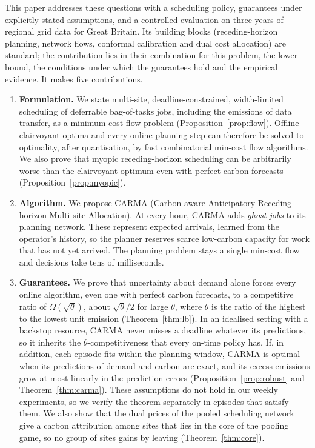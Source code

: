 This paper addresses these questions with a scheduling policy, guarantees under explicitly stated assumptions, and a controlled evaluation on three years of regional grid data for Great Britain. Its building blocks (receding-horizon planning, network flows, conformal calibration and dual cost allocation) are standard; the contribution lies in their combination for this problem, the lower bound, the conditions under which the guarantees hold and the empirical evidence. It makes five contributions.
\begin{enumerate}
\item \textbf{Formulation.} We state multi-site, deadline-constrained, width-limited scheduling of deferrable bag-of-tasks jobs, including the emissions of data transfer, as a minimum-cost flow problem (Proposition~\ref{prop:flow}). Offline clairvoyant optima and every online planning step can therefore be solved to optimality, after quantisation, by fast combinatorial min-cost flow algorithms. We also prove that myopic receding-horizon scheduling can be arbitrarily worse than the clairvoyant optimum even with perfect carbon forecasts (Proposition~\ref{prop:myopic}).
\item \textbf{Algorithm.} We propose CARMA (Carbon-aware Anticipatory Receding-horizon Multi-site Allocation). At every hour, CARMA adds \emph{ghost jobs} to its planning network. These represent expected arrivals, learned from the operator's history, so the planner reserves scarce low-carbon capacity for work that has not yet arrived. The planning problem stays a single min-cost flow and decisions take tens of milliseconds.
\item \textbf{Guarantees.} We prove that uncertainty about demand alone forces every online algorithm, even one with perfect carbon forecasts, to a competitive ratio of $\Omega(\sqrt{\theta})$, about $\sqrt{\theta}/2$ for large $\theta$, where $\theta$ is the ratio of the highest to the lowest unit emission (Theorem~\ref{thm:lb}). In an idealised setting with a backstop resource, CARMA never misses a deadline whatever its predictions, so it inherits the $\theta$-competitiveness that every on-time policy has. If, in addition, each episode fits within the planning window, CARMA is optimal when its predictions of demand and carbon are exact, and its excess emissions grow at most linearly in the prediction errors (Proposition~\ref{prop:robust} and Theorem~\ref{thm:carma}). These assumptions do not hold in our weekly experiments, so we verify the theorem separately in episodes that satisfy them. We also show that the dual prices of the pooled scheduling network give a carbon attribution among sites that lies in the core of the pooling game, so no group of sites gains by leaving (Theorem~\ref{thm:core}).

\end{enumerate}

